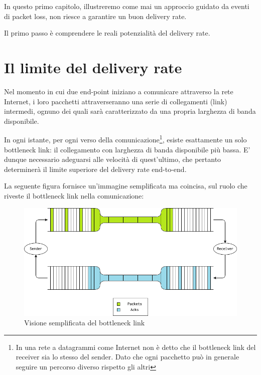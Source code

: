 
In questo primo capitolo, illustreremo come mai un approccio guidato da eventi di packet loss, non riesce a garantire un buon delivery rate. \bigskip

Il primo passo è comprendere le reali potenzialità del delivery rate.

\section{Il limite del delivery rate}

Nel momento in cui due end-point iniziano a comunicare attraverso la rete Internet, i loro pacchetti attraverseranno una serie di collegamenti (link) intermedi, ognuno dei quali sarà caratterizzato da una propria larghezza di banda disponibile. \bigskip


In ogni istante, per ogni verso della comunicazione\footnote{In una rete a datagrammi come Internet non è detto che il bottleneck link del receiver sia lo stesso del sender. Dato che ogni pacchetto può in generale seguire un percorso diverso rispetto gli altri}, esiste esattamente un solo bottleneck link: il collegamento con larghezza di banda disponibile più bassa. E' dunque necessario adeguarsi alle velocità di quest'ultimo, che pertanto determinerà il limite superiore del delivery rate end-to-end. \bigskip

La seguente figura fornisce un'immagine semplificata ma coincisa, sul ruolo che riveste il bottleneck link nella comunicazione:

\begin{figure}[H]

\center
\caption{Visione semplificata del bottleneck link}
\includegraphics[scale=0.7]{chapters/2_failed/img/bottleneck_link}

\end{figure}


